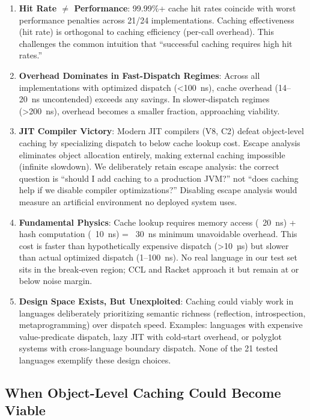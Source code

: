\documentclass[sigplan,final,acmsmall,review,screen]{acmart}
\begin{document}
\begin{enumerate}
  \item \textbf{Hit Rate $\neq$ Performance}: 99.99\%+ cache hit rates coincide with worst performance penalties across 21/24 implementations.
    Caching effectiveness (hit rate) is orthogonal to caching efficiency (per-call overhead). This challenges the common intuition
    that ``successful caching requires high hit rates.''

  \item \textbf{Overhead Dominates in Fast-Dispatch Regimes}: Across all implementations with optimized dispatch (<100~ns),
    cache overhead (14--20~ns uncontended) exceeds any savings. In slower-dispatch regimes (>200~ns), overhead becomes a smaller fraction,
    approaching viability.

  \item \textbf{JIT Compiler Victory}: Modern JIT compilers (V8, C2) defeat object-level caching by specializing dispatch to below cache lookup cost.
    Escape analysis eliminates object allocation entirely, making external caching impossible (infinite slowdown). We deliberately retain escape analysis: the correct question is ``should I add caching to a production JVM?'' not ``does caching help if we disable compiler optimizations?'' Disabling escape analysis would measure an artificial environment no deployed system uses.

  \item \textbf{Fundamental Physics}: Cache lookup requires memory access (~20~ns) + hash computation (~10~ns) = ~30~ns minimum unavoidable overhead.
    This cost is faster than hypothetically expensive dispatch (>10~µs) but slower than actual optimized dispatch (1--100~ns).
    No real language in our test set sits in the break-even region; CCL and Racket approach it but remain at or below noise margin.

  \item \textbf{Design Space Exists, But Unexploited}: Caching could viably work in languages deliberately prioritizing semantic richness
    (reflection, introspection, metaprogramming) over dispatch speed. Examples: languages with expensive value-predicate dispatch,
    lazy JIT with cold-start overhead, or polyglot systems with cross-language boundary dispatch. None of the 21 tested languages
    exemplify these design choices.
\end{enumerate}

\subsection{When Object-Level Caching Could Become Viable}
\end{document}
